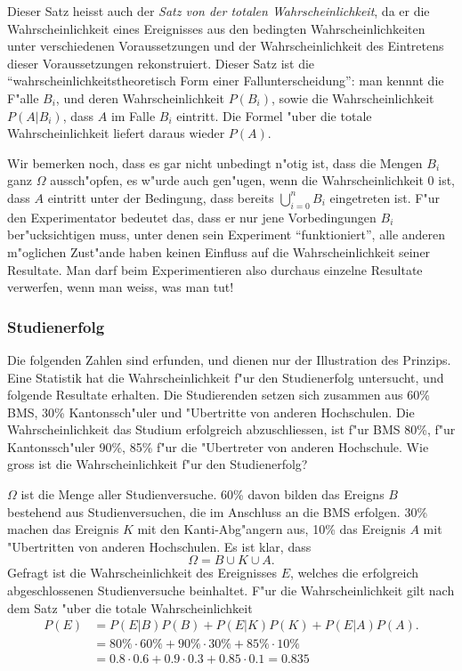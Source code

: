 Dieser Satz heisst auch der {\em Satz von der totalen Wahrscheinlichkeit},
da er die Wahrscheinlichkeit eines Ereignisses aus den bedingten
Wahrscheinlichkeiten unter verschiedenen Voraussetzungen und der
Wahrscheinlichkeit des Eintretens dieser Voraussetzungen rekonstruiert.
Dieser Satz ist die ``wahrscheinlichkeitstheoretisch Form einer
Fallunterscheidung'': man kennnt die F"alle $B_i$, und deren Wahrscheinlichkeit
$P(B_i)$, sowie die Wahrscheinlichkeit $P(A|B_i)$, dass $A$ im Falle 
$B_i$ eintritt. Die Formel "uber die totale Wahrscheinlichkeit
liefert daraus wieder $P(A)$.

Wir bemerken noch, dass es gar nicht unbedingt n"otig ist, dass die Mengen
$B_i$ ganz $\Omega$ aussch"opfen, es w"urde auch
gen"ugen, wenn die Wahrscheinlichkeit $0$ ist, dass $A$ eintritt
unter der Bedingung,
dass bereits $\bigcup_{i=0}^{n}B_i$ eingetreten ist.
F"ur den
Experimentator bedeutet das, dass er nur jene Vorbedingungen $B_i$
ber"ucksichtigen muss, unter denen sein Experiment ``funktioniert'',
alle anderen m"oglichen Zust"ande haben keinen Einfluss auf
die Wahrscheinlichkeit seiner Resultate. Man darf beim Experimentieren
also durchaus einzelne Resultate verwerfen, wenn man weiss, was man tut!

\subsubsection{Studienerfolg}
Die folgenden Zahlen sind erfunden, und dienen nur der Illustration
des Prinzips. Eine Statistik hat die Wahrscheinlichkeit f"ur den
Studienerfolg untersucht, und folgende Resultate erhalten.
Die Studierenden setzen sich zusammen aus 60\% BMS, 30\% Kantonssch"uler
und "Ubertritte von anderen Hochschulen. Die Wahrscheinlichkeit
das Studium erfolgreich abzuschliessen, ist f"ur BMS 80\%,
f"ur Kantonssch"uler 90\%, 85\% f"ur die "Ubertreter von anderen
Hochschule. Wie gross ist die Wahrscheinlichkeit f"ur den Studienerfolg?

$\Omega$ ist die Menge aller Studienversuche. 60\% davon bilden das
Ereigns $B$ bestehend aus Studienversuchen, die im Anschluss an die BMS
erfolgen. 30\% machen das Ereignis $K$ mit den Kanti-Abg"angern aus,
10\% das Ereignis $A$ mit "Ubertritten von anderen Hochschulen. Es ist
klar, dass 
\[
\Omega = B \cup K\cup A.
\]
Gefragt ist die Wahrscheinlichkeit des Ereignisses $E$, welches
die erfolgreich abgeschlossenen Studienversuche beinhaltet.
F"ur die Wahrscheinlichkeit gilt nach dem Satz "uber die totale
Wahrscheinlichkeit
\begin{align*}
P(E)&=P(E|B)P(B)+P(E|K)P(K)+P(E|A)P(A).
\\
    &= 80\%\cdot 60\%
     + 90\%\cdot 30\%
     + 85\%\cdot 10\%
\\
&=0.8\cdot 0.6 + 0.9 \cdot 0.3 + 0.85 \cdot 0.1 = 0.835
\end{align*}

